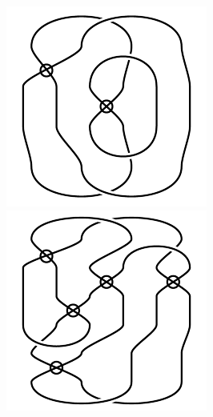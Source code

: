 \begin{figure}[H]
\begin{minipage}[b]{.18\linewidth}
\centering
\includegraphics[width=\linewidth]{../data/virtual_4_77.png}
\end{minipage}
\begin{minipage}[b]{.18\linewidth}
\centering
\includegraphics[width=\linewidth]{../data/virtual_4_78.png}

\end{minipage}
\end{figure}
